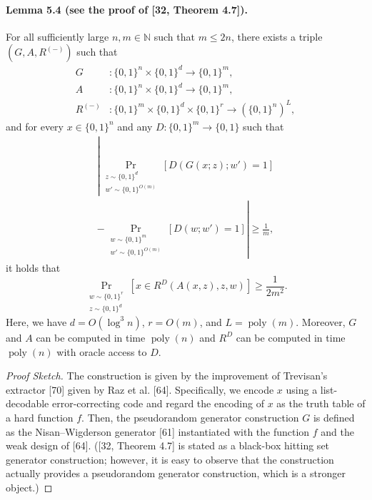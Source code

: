 \paragraph{Lemma 5.4 (see the proof of [32, Theorem 4.7]).}
For all sufficiently large $n,m\in\mathbb N$ such that $m\leq2n$, there exists a triple $(G,A,R^{(-)})$ such that
\[\begin{aligned}
G&:\{0,1\}^n\times\{0,1\}^d\to\{0,1\}^m,\\
A&:\{0,1\}^n\times\{0,1\}^d\to\{0,1\}^m,\\
R^{(-)}&:\{0,1\}^m\times\{0,1\}^d\times\{0,1\}^r\to(\{0,1\}^n)^L,
\end{aligned}\]
and for every $x\in\{0,1\}^n$ and any $D:\{0,1\}^m\to\{0,1\}$ such that
\begin{multline*}
\left|\Pr_{\substack{z\sim\{0,1\}^d\\w'\sim\{0,1\}^{O(m)}}}[D(G(x;z);w')=1]\right.\\
\left.-\Pr_{\substack{w\sim\{0,1\}^m\\w'\sim\{0,1\}^{O(m)}}}[D(w;w')=1]\right|\geq\frac1m,
\end{multline*}
it holds that
\[\Pr_{\substack{w\sim\{0,1\}^r\\z\sim\{0,1\}^d}}[x\in R^D(A(x,z),z,w)]\geq\frac1{2m^2}.\]
Here, we have $d=O(\log^3n)$, $r=O(m)$, and $L=\operatorname{poly}(m)$. Moreover, $G$ and $A$ can be computed in time $\operatorname{poly}(n)$ and $R^D$ can be computed in time $\operatorname{poly}(n)$ with oracle access to $D$.
\begin{proof}[Proof Sketch]
The construction is given by the improvement of Trevisan's extractor [70] given by Raz et al. [64]. Specifically, we encode $x$ using a list-decodable error-correcting code and regard the encoding of $x$ as the truth table of a hard function $f$. Then, the pseudorandom generator construction $G$ is defined as the Nisan--Wigderson generator [61] instantiated with the function $f$ and the weak design of [64]. ([32, Theorem 4.7] is stated as a black-box hitting set generator construction; however, it is easy to observe that the construction actually provides a pseudorandom generator construction, which is a stronger object.)
\end{proof}
